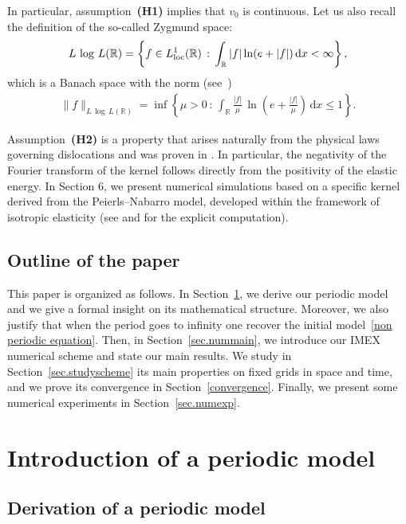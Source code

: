 \documentclass[11pt]{amsart}
\newcommand{\dd}{\mathrm{d}}
\newcommand{\R}{\mathbb{R}}
\begin{document}
In particular, assumption~\textbf{(H1)} implies that $v_0$ is continuous. Let us also recall the definition of the so-called Zygmund space:
\begin{equation}\label{defLlogL}
    L\, \log \,L(\R) = \left\{ f \in L^1_{{\rm loc}}(\R) \, : \, \int_{\R} |f|\ln( e + |f|) \, \dd x <  \infty \right\},
\end{equation}
which is a Banach space with the norm (see~\cite{111})
\begin{align*}
\|f\|_{L\,\log \,L(\R)} = \inf \left\{ \mu > 0 \, : \, \int_{\mathbb{R}} \frac{|f|}{\mu} \,\ln \left( e + \frac{|f|}{\mu} \right) \, \dd x \leq 1 \right\}.
\end{align*}

Assumption~\textbf{(H2)} is a property that arises naturally from the physical laws governing dislocations and was proven in \cite[Proposition 6.1]{311}. In particular, the negativity of the Fourier transform of the kernel follows directly from the positivity of the elastic energy. In Section 6, we present numerical simulations based on a specific kernel derived from the Peierls–Nabarro model, developed within the framework of isotropic elasticity (see  \cite{19} and  \cite[Sec. 6.2.2]{311} for the explicit computation).



\subsection{Outline of the paper}
This paper is organized as follows. In Section~\ref{sec.periodicmodel}, we derive our periodic model and we give a formal insight on its mathematical structure. Moreover, we also justify that when the period goes to infinity one recover the initial model~\eqref{non periodic equation}. Then, in Section~\ref{sec.nummain}, we introduce our IMEX numerical scheme and state our main results. We study in Section~\ref{sec.studyscheme} its main properties on fixed grids in space and time, and we prove its convergence in Section~\ref{convergence}. Finally, we present some numerical experiments in Section~\ref{sec.numexp}.


\section{Introduction of a periodic model}\label{sec.periodicmodel}

\subsection{Derivation of a periodic model}\label{sec.derivperiodic}
\end{document}
